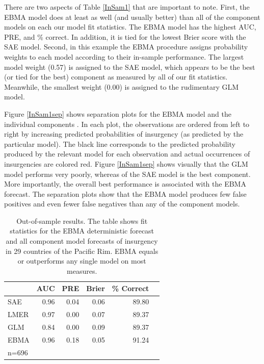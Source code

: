 There are two aspects of Table \ref{InSam1} that are important to
note.  First, the EBMA model does at least as well (and usually
better) than all of the component models on each our model fit
statistics.  The EBMA model has the highest AUC, PRE, and \% correct.
In addition, it is tied for the lowest Brier score with the SAE model.
Second, in this example the EBMA procedure assigns probability weights
to each model according to their in-sample performance.  The largest
model weight (0.57) is assigned to the SAE model, which appears to be
the best (or tied for the best) component as measured by all of our
fit statistics. Meanwhile, the smallest weight (0.00) is assigned to
the rudimentary GLM model.

Figure \ref{InSam1sep} shows separation plots for the EBMA model and
the individual components \citep{Greenhill:2011}. In each plot, the
observations are ordered from left to right by increasing predicted
probabilities of insurgency (as predicted by the particular
model). The black line corresponds to the predicted probability
produced by the relevant model for each observation and actual
occurrences of insurgencies are colored red.  Figure \ref{InSam1sep}
shows visually that the GLM model performs very poorly, whereas of the
SAE model is the best component.  More importantly, the overall best
performance is associated with the EBMA forecast. The separation plots
show that the EBMA model produces few false positives and even fewer
false negatives than any of the component models.

\begin{table}[h!]
\small
\begin{center}
  \caption{\footnotesize Out-of-sample results.  The table shows fit
    statistics for the EBMA deterministic forecast and all component
    model forecasts of insurgency in 29 countries of the Pacific Rim.
    EBMA equals or outperforms any single model on most
    measures.}\label{OutSam1}
\begin{tabular}{lrrrrr}
  \toprule
 & AUC & PRE & Brier & \% Correct   \\ 
  \midrule
  SAE &  0.96 & 0.04 & 0.06 & 89.80   \\ 
  LMER & 0.97 & 0.00 & 0.07 & 89.37  \\ 
  GLM & 0.84 & 0.00 & 0.09 & 89.37  \\ 
  EBMA & 0.96 & 0.18 & 0.05 & 91.24 \\ 
   \bottomrule
n=696 \\
\end{tabular}
\end{center}
\end{table}

